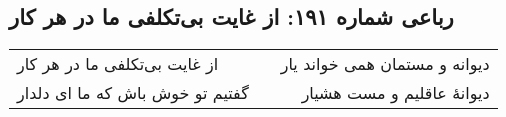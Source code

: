 \begin{center}
\section*{رباعی شماره ۱۹۱: از غایت بی‌تکلفی ما در هر کار}
\label{sec:sh191}
\begin{longtable}{l p{0.5cm} r}
از غایت بی‌تکلفی ما در هر کار
&&
دیوانه و مستمان همی خواند یار
\\
گفتیم تو خوش باش که ما ای دلدار
&&
دیوانهٔ عاقلیم و مست هشیار
\\
\end{longtable}
\end{center}

